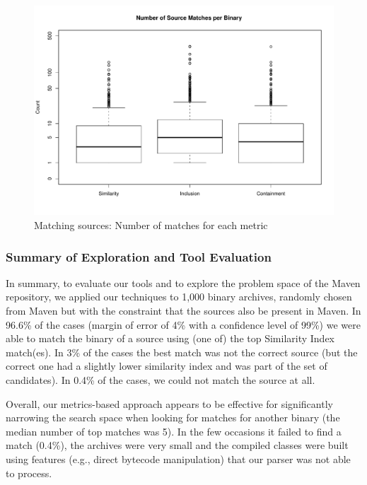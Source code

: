 \begin{figure}[h]
  \centering
\includegraphics[width=\columnwidth]{plots/boxplotAllMatches.pdf}  
\vspace{-7mm}
  \caption{Matching sources: Number of matches for each metric}
  \label{fig:matchesMetric}
\end{figure}


\subsubsection{Summary of Exploration and Tool Evaluation}

In summary, to evaluate our tools and to explore the problem space
of the Maven repository, we applied our techniques to 1,000 binary
archives, randomly chosen from Maven but with the constraint that the
sources also be present in Maven.  In 96.6\% of the cases (margin of
error of 4\% with a confidence level of 99\%) we were able to match
the binary of a source using (one of) the top Similarity Index
match(es). In 3\% of the cases the best match was not the correct
source (but the correct one had a slightly lower similarity index and
was part of the set of candidates). In 0.4\% of the cases, we could not match
the source at all.

Overall, our metrics-based approach appears to be effective for
significantly narrowing the search space when looking for matches for
another binary (the median number of top matches was 5). In the few
occasions it failed to find a match (0.4\%), the archives were very small
and the compiled classes were built using features (e.g., direct bytecode
manipulation) that our parser was not able to process.

